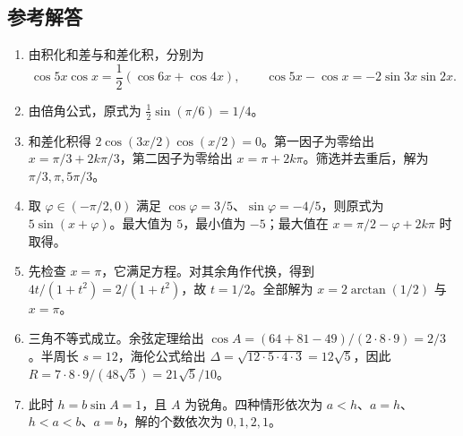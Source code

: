 \documentclass[UTF8]{ctexart}
\begin{document}
\subsection{参考解答}

\begin{enumerate}
  \item 由积化和差与和差化积，分别为
  \[
    \cos5x\cos x=\frac12(\cos6x+\cos4x),\qquad
    \cos5x-\cos x=-2\sin3x\sin2x.
  \]
  \item 由倍角公式，原式为 $\tfrac12\sin(\pi/6)=1/4$。
  \item 和差化积得 $2\cos(3x/2)\cos(x/2)=0$。第一因子为零给出 $x=\pi/3+2k\pi/3$，第二因子为零给出 $x=\pi+2k\pi$。筛选并去重后，解为 $\pi/3,\pi,5\pi/3$。
  \item 取 $\varphi\in(-\pi/2,0)$ 满足 $\cos\varphi=3/5$、$\sin\varphi=-4/5$，则原式为 $5\sin(x+\varphi)$。最大值为 $5$，最小值为 $-5$；最大值在 $x=\pi/2-\varphi+2k\pi$ 时取得。
  \item 先检查 $x=\pi$，它满足方程。对其余角作代换，得到 $4t/(1+t^2)=2/(1+t^2)$，故 $t=1/2$。全部解为 $x=2\arctan(1/2)$ 与 $x=\pi$。
  \item 三角不等式成立。余弦定理给出 $\cos A=(64+81-49)/(2\cdot8\cdot9)=2/3$。半周长 $s=12$，海伦公式给出 $\Delta=\sqrt{12\cdot5\cdot4\cdot3}=12\sqrt5$，因此 $R=7\cdot8\cdot9/(48\sqrt5)=21\sqrt5/10$。
  \item 此时 $h=b\sin A=1$，且 $A$ 为锐角。四种情形依次为 $a<h$、$a=h$、$h<a<b$、$a=b$，解的个数依次为 $0,1,2,1$。
\end{enumerate}
\end{document}
